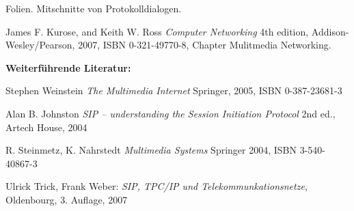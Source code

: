 \begin{course}
\begin{content}
\end{content}

\begin{media}Folien. Mitschnitte von Protokolldialogen.

\end{media}

\begin{literature}James F. Kurose, and Keith W. Ross \emph{Computer Networking} 4th edition, Addison-Wesley/Pearson, 2007, ISBN 0-321-49770-8, Chapter Mulitmedia Networking.

 

\textbf{Weiterführende Literatur:}

 

Stephen Weinstein \emph{The Multimedia Internet} Springer, 2005, ISBN 0-387-23681-3

 

Alan B. Johnston \emph{SIP – understanding the Session Initiation Protocol} 2nd ed., Artech House, 2004

 

R. Steinmetz, K. Nahrstedt \emph{Multimedia Systems} Springer 2004, ISBN 3-540-40867-3

 

Ulrick Trick, Frank Weber: \emph{SIP, TPC/IP und Telekommunkationsnetze}, Oldenbourg, 3.\newline
Auflage, 2007

\end{literature}



\end{course}